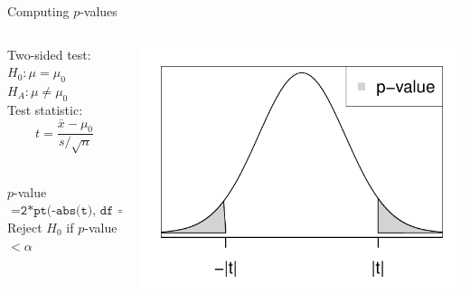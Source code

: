 \documentclass[fleqn, 10pt]{beamer}\usepackage[]{graphicx}\usepackage[]{color}
\begin{document}
\begin{frame}{Computing $p$-values}
\begin{columns}
\begin{column}{0.55\textwidth}
Two-sided test:\\
$H_0: \mu = \mu_0$\\
$H_A: \mu \neq \mu_0$\\
\vspace{10pt}
Test statistic:\\
$$t = \frac{\bar{x} - \mu_0}{s/\sqrt{n}}$$\\
\vspace{10pt}

$p$-value $= \texttt{2*pt(-abs(t), df = n-1)}$\\ 
\vspace{10pt}
Reject $H_0$ if $p$-value $< \alpha$\\
\end{column}
\begin{column}{0.45\textwidth}
\includegraphics[scale=0.5]{figure/pvalue_both.pdf}
\end{column}
\end{columns}
\vspace{1cm}
\end{frame}
\end{document}

